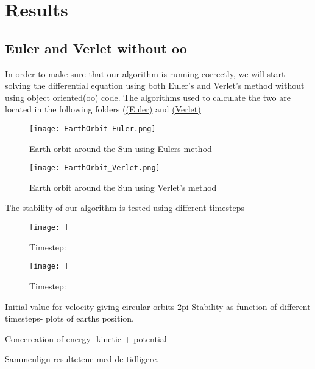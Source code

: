 \documentclass[../main.tex]{subfiles}
\begin{document}
\section{Results}\label{results}
\subsection{Euler and Verlet without oo}
In order to make sure that our algorithm is running correctly, we will start solving the differential equation using both Euler's and Verlet's method without using object oriented(oo) code. The algorithms used to calculate the two are located in the following folders (\href{https://github.com/kmaasrud/Project-5/tree/master/code/Earth-Sun_Euler-FWD}{(Euler)} and \href{https://github.com/kmaasrud/Project-5/tree/master/code/Earth-Sun_Verlet}{(Verlet)}

\begin{figure}[!h]
  \centering
  \parbox{5cm}{
  \texttt{[image: EarthOrbit\_Euler.png]}
  \caption{Earth orbit around the Sun using Eulers method}
  \label{fig:EarthOrbit_Euler}}
  \qquad
  \begin{minipage}{5cm}
    \texttt{[image: EarthOrbit\_Verlet.png]}
    \caption{Earth orbit around the Sun using Verlet's method}
    \label{fig:EarthOrbit_Verlet}
  \end{minipage}
  \end{figure}
\FloatBarrier



The stability of our algorithm is tested using different timesteps
\begin{figure}[!h]
  \centering
  \parbox{5cm}{
  \texttt{[image: ]}
  \caption{Timestep: }
  \label{fig:}}
  \qquad
  \begin{minipage}{5cm}
    \texttt{[image: ]}
    \caption{Timestep: }
    \label{fig:}
  \end{minipage}
  \end{figure}
\FloatBarrier

Initial value for velocity giving circular orbits 2pi
Stability as function of different timesteps- plots of earths position.

Concercation of energy- kinetic + potential

Sammenlign resultetene med de tidligere.
\end{document}
